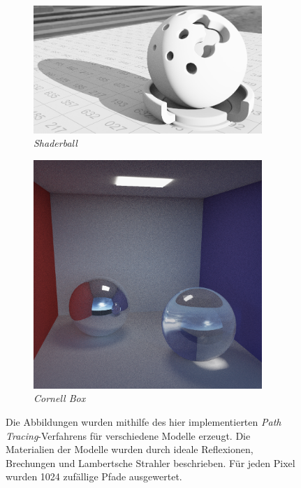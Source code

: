 \documentclass[crop=false]{standalone}
\begin{document}
\begin{figure}[h]
        \begin{subfigure}[b]{0.635\textwidth}
          \center
          \includegraphics[width=0.95\textwidth]{images/path_tracing-shaderball.png}
          \caption{\textit{Shaderball}}
        \end{subfigure}
        \begin{subfigure}[b]{0.358\textwidth}
          \center
          \includegraphics[width=0.95\textwidth]{images/path_tracing-cornell_box.png}
          \caption{\textit{Cornell Box}}
        \end{subfigure}
        \caption{%
          Die Abbildungen wurden mithilfe des hier implementierten \textit{Path Tracing}-Verfahrens für verschiedene Modelle erzeugt.
          Die Materialien der Modelle wurden durch ideale Reflexionen, Brechungen und Lambertsche Strahler beschrieben.
          Für jeden Pixel wurden 1024 zufällige Pfade ausgewertet.
        }
        \label{fig:path-tracing-results}
      \end{figure}
\end{document}
